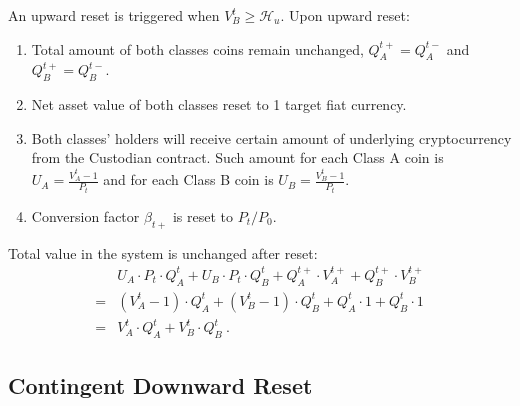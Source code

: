 \documentclass[11pt]{article}%
\numberwithin{equation}{section}
\theoremstyle{plain}
\begin{document}
\begin{appendices}
An upward reset is triggered when $V_{B}^{t}\geqslant\mathcal{H}_{u}$. Upon upward reset:
\begin{enumerate}
\item Total amount of both classes coins remain unchanged, $Q_{A}^{t+}=Q_{A}^{t-}$ and $Q_{B}^{t+}=Q_{B}^{t-}$.
\item Net asset value of both classes reset to 1 target fiat currency.
\item Both classes' holders will receive certain amount of underlying cryptocurrency from the Custodian contract. Such amount for each Class A coin is $U_{A}=\frac{V_{A}^{t}-1}{P_{t}}$ and for each Class B coin is $U_{B}=\frac{V_{B}^{t}-1}{P_{t}}$.
\item Conversion factor $\beta_{t+}$ is reset to $P_t/P_0$.
\end{enumerate}
Total value in the system is unchanged after reset:
\begin{align*}
 & U_{A}\cdot P_{t}\cdot Q_{A}^{t}+U_{B}\cdot P_{t}\cdot Q_{B}^{t}+Q_{A}^{t+}\cdot V_{A}^{t+}+Q_{B}^{t+}\cdot V_{B}^{t+}\\
= & \left(V_{A}^{t}-1\right)\cdot Q_{A}^{t}+\left(V_{B}^{t}-1\right)\cdot Q_{B}^{t}+Q_{A}^{t}\cdot1+Q_{B}^{t}\cdot1\\
= & V_{A}^{t}\cdot Q_{A}^{t}+V_{B}^{t}\cdot Q_{B}^{t}\ .
\end{align*}

\subsection{Contingent Downward Reset\label{subsec:Contingent-Downward-Reset}}


\end{appendices}
\end{document}
